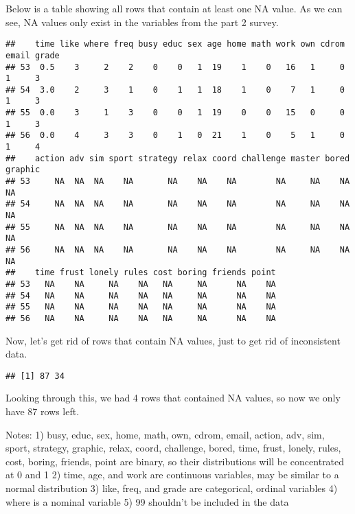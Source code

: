 \documentclass[
]{article}
\begin{document}
Below is a table showing all rows that contain at least one NA value. As
we can see, NA values only exist in the variables from the part 2
survey.

\begin{verbatim}
##    time like where freq busy educ sex age home math work own cdrom email grade
## 53  0.5    3     2    2    0    0   1  19    1    0   16   1     0     1     3
## 54  3.0    2     3    1    0    1   1  18    1    0    7   1     0     1     3
## 55  0.0    3     1    3    0    0   1  19    0    0   15   0     0     1     3
## 56  0.0    4     3    3    0    1   0  21    1    0    5   1     0     1     4
##    action adv sim sport strategy relax coord challenge master bored graphic
## 53     NA  NA  NA    NA       NA    NA    NA        NA     NA    NA      NA
## 54     NA  NA  NA    NA       NA    NA    NA        NA     NA    NA      NA
## 55     NA  NA  NA    NA       NA    NA    NA        NA     NA    NA      NA
## 56     NA  NA  NA    NA       NA    NA    NA        NA     NA    NA      NA
##    time frust lonely rules cost boring friends point
## 53   NA    NA     NA    NA   NA     NA      NA    NA
## 54   NA    NA     NA    NA   NA     NA      NA    NA
## 55   NA    NA     NA    NA   NA     NA      NA    NA
## 56   NA    NA     NA    NA   NA     NA      NA    NA
\end{verbatim}

Now, let's get rid of rows that contain NA values, just to get rid of
inconsistent data.

\begin{verbatim}
## [1] 87 34
\end{verbatim}

Looking through this, we had 4 rows that contained NA values, so now we
only have 87 rows left.

Notes: 1) busy, educ, sex, home, math, own, cdrom, email, action, adv,
sim, sport, strategy, graphic, relax, coord, challenge, bored, time,
frust, lonely, rules, cost, boring, friends, point are binary, so their
distributions will be concentrated at 0 and 1 2) time, age, and work are
continuous variables, may be similar to a normal distribution 3) like,
freq, and grade are categorical, ordinal variables 4) where is a nominal
variable 5) 99 shouldn't be included in the data
\end{document}
